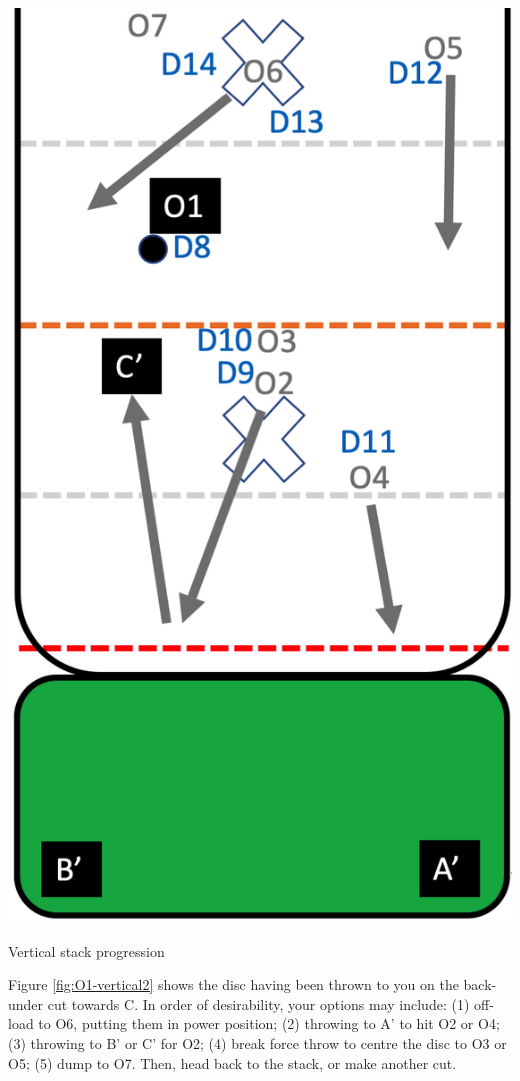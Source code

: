 \documentclass{tufte-handout}
\begin{document}
\begin{marginfigure}%
  \includegraphics[width=\linewidth]{O1-vertical2}
  \caption{Vertical stack progression}
  \label{fig:O1-vertical2}
\end{marginfigure}


Figure \ref{fig:O1-vertical2} shows 
the disc having been thrown to you
on the back-under cut towards C. 
In order of desirability, 
your options may include: 
(1)
off-load to O6, 
putting them in power position;
(2) throwing to A' to hit O2 or O4;
(3) throwing to B' or C' for O2;
(4) break force throw 
to centre the disc
to O3 or O5;
(5) dump to O7.
Then, head back to the stack, 
or make another cut.
\end{document}
